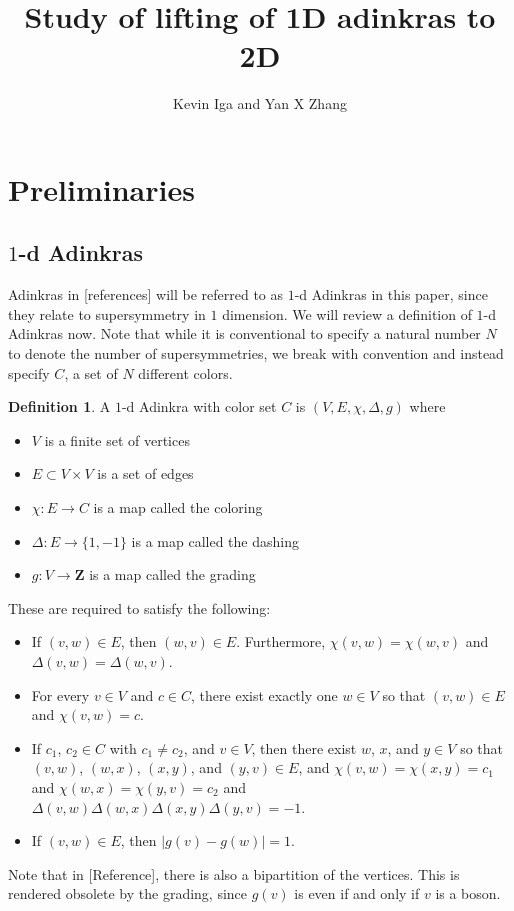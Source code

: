 \documentclass[12pt,twoside,singlespace]{article}
\title{Study of lifting of 1D adinkras to 2D}
\author{Kevin Iga and Yan X Zhang}
\numberwithin{equation}{section}
\theoremstyle{definition}
\newtheorem{definition}[equation]{Definition}
\newcommand{\ZZ}{\mathbf{Z}}
\begin{document}
\pagestyle{plain}

\maketitle

\section{Preliminaries}

\subsection{$1$-d Adinkras}
Adinkras in [references] will be referred to as $1$-d Adinkras in this paper, since they relate to supersymmetry in $1$ dimension.  We will review a definition of $1$-d Adinkras now.  Note that while it is conventional to specify a natural number $N$ to denote the number of supersymmetries, we break with convention and instead specify $C$, a set of $N$ different colors.

\begin{definition}
A $1$-d Adinkra with color set $C$ is $(V,E,\chi,\Delta,g)$ where
\begin{itemize}
\item $V$ is a finite set of vertices
\item $E\subset V\times V$ is a set of edges
\item $\chi:E\to C$ is a map called the coloring
\item $\Delta:E\to \{1,-1\}$ is a map called the dashing
\item $g:V\to\ZZ$ is a map called the grading
\end{itemize}

These are required to satisfy the following:
\begin{itemize}
\item If $(v,w)\in E$, then $(w,v)\in E$.  Furthermore, $\chi(v,w)=\chi(w,v)$ and $\Delta(v,w)=\Delta(w,v)$.
\item For every $v\in V$ and $c\in C$, there exist exactly one $w\in V$ so that $(v,w)\in E$ and $\chi(v,w)=c$.
\item If $c_1$, $c_2\in C$ with $c_1\not=c_2$, and $v\in V$, then there exist $w$, $x$, and $y\in V$ so that $(v,w)$, $(w,x)$, $(x,y)$, and $(y,v)\in E$, and $\chi(v,w)=\chi(x,y)=c_1$ and $\chi(w,x)=\chi(y,v)=c_2$ and $\Delta(v,w)\Delta(w,x)\Delta(x,y)\Delta(y,v)=-1$.
\item If $(v,w)\in E$, then $|g(v)-g(w)|=1$.
\end{itemize}
\end{definition}
Note that in [Reference], there is also a bipartition of the vertices.  This is rendered obsolete by the grading, since $g(v)$ is even if and only if $v$ is a boson.
\end{document}
